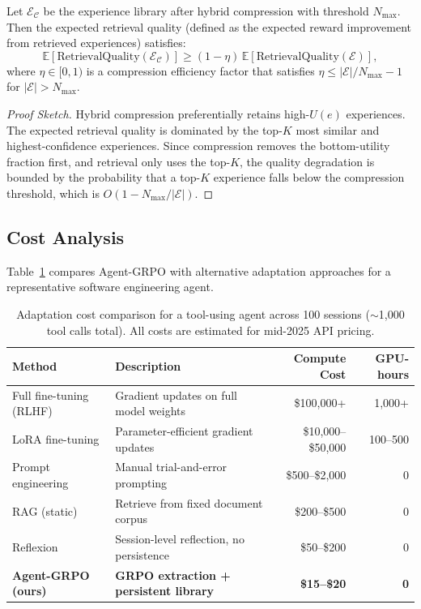 \begin{proposition}
\label{prop:compression}
Let $\mathcal{E}_\mathcal{C}$ be the experience library after hybrid
compression with threshold $N_{\max}$. Then the expected retrieval quality
(defined as the expected reward improvement from retrieved experiences)
satisfies:
\begin{equation}
    \mathbb{E}[\text{RetrievalQuality}(\mathcal{E}_\mathcal{C})]
    \geq (1 - \eta)\,\mathbb{E}[\text{RetrievalQuality}(\mathcal{E})],
    \label{eq:compression-quality}
\end{equation}
where $\eta \in [0, 1)$ is a compression efficiency factor that satisfies
$\eta \leq |\mathcal{E}| / N_{\max} - 1$ for $|\mathcal{E}| > N_{\max}$.
\end{proposition}

\begin{proof}[Proof Sketch]
Hybrid compression preferentially retains high-$U(e)$ experiences. The
expected retrieval quality is dominated by the top-$K$ most similar and
highest-confidence experiences. Since compression removes the bottom-utility
fraction first, and retrieval only uses the top-$K$, the quality degradation
is bounded by the probability that a top-$K$ experience falls below the
compression threshold, which is $O(1 - N_{\max}/|\mathcal{E}|)$.
\end{proof}

\subsection{Cost Analysis}

Table~\ref{tab:cost} compares Agent-GRPO with alternative adaptation
approaches for a representative software engineering agent.

\begin{table}[H]
\centering
\caption{Adaptation cost comparison for a tool-using agent across 100 sessions
($\sim$1,000 tool calls total). All costs are estimated for mid-2025 API pricing.}
\label{tab:cost}
\begin{tabularx}{\textwidth}{lXrr}
\toprule
\textbf{Method} & \textbf{Description} & \textbf{Compute Cost} & \textbf{GPU-hours} \\
\midrule
Full fine-tuning (RLHF)   & Gradient updates on full model weights & \$100,000+ & 1,000+ \\
LoRA fine-tuning           & Parameter-efficient gradient updates     & \$10,000--\$50,000 & 100--500 \\
Prompt engineering         & Manual trial-and-error prompting         & \$500--\$2,000 & 0 \\
RAG (static)               & Retrieve from fixed document corpus      & \$200--\$500 & 0 \\
Reflexion~\cite{shinn2023reflexion} & Session-level reflection, no persistence & \$50--\$200 & 0 \\
\textbf{Agent-GRPO (ours)} & \textbf{GRPO extraction + persistent library} & \textbf{\$15--\$20} & \textbf{0} \\
\bottomrule
\end{tabularx}
\end{table}


